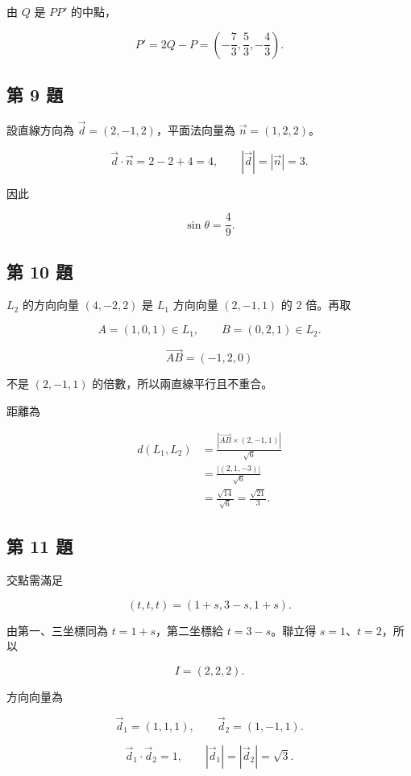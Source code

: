 \documentclass[11pt,a4paper]{article}
\begin{document}
由 \(Q\) 是 \(PP'\) 的中點，

\[
P'=2Q-P
=\boxed{\left(-\frac73,\frac53,-\frac43\right)}.
\]

\subsection{第 9 題}\label{ux7b2c-9-ux984c}

設直線方向為 \(\vec d=(2,-1,2)\)，平面法向量為 \(\vec n=(1,2,2)\)。

\[
\vec d\cdot\vec n=2-2+4=4,
\qquad |\vec d|=|\vec n|=3.
\]

因此

\[
\boxed{\sin\theta=\frac49}.
\]

\subsection{第 10 題}\label{ux7b2c-10-ux984c}

\(L_2\) 的方向向量 \((4,-2,2)\) 是 \(L_1\) 方向向量 \((2,-1,1)\) 的 \(2\) 倍。再取

\[
A=(1,0,1)\in L_1,
\qquad B=(0,2,1)\in L_2.
\]

\[
\overrightarrow{AB}=(-1,2,0)
\]

不是 \((2,-1,1)\) 的倍數，所以兩直線平行且不重合。

距離為

\[
\begin{aligned}
d(L_1,L_2)
&=\frac{|\overrightarrow{AB}\times(2,-1,1)|}{\sqrt6}\\
&=\frac{|(2,1,-3)|}{\sqrt6}\\
&=\boxed{\frac{\sqrt{14}}{\sqrt6}=\frac{\sqrt{21}}3}.
\end{aligned}
\]

\subsection{第 11 題}\label{ux7b2c-11-ux984c}

交點需滿足

\[
(t,t,t)=(1+s,3-s,1+s).
\]

由第一、三坐標同為 \(t=1+s\)，第二坐標給 \(t=3-s\)。聯立得 \(s=1\)、\(t=2\)，所以

\[
\boxed{I=(2,2,2)}.
\]

方向向量為

\[
\vec d_1=(1,1,1),\qquad \vec d_2=(1,-1,1).
\]

\[
\vec d_1\cdot\vec d_2=1,
\qquad |\vec d_1|=|\vec d_2|=\sqrt3.
\]
\end{document}
